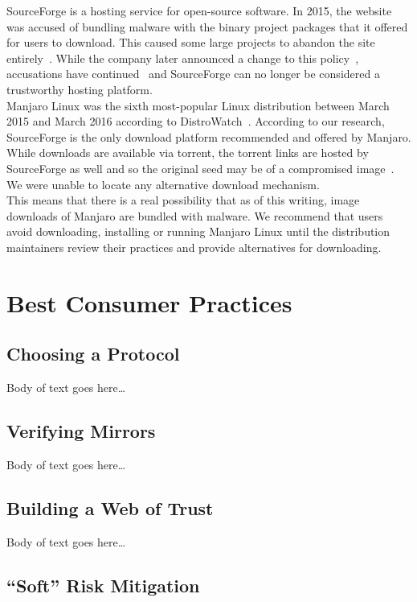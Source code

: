 \documentclass[conference]{IEEEtran}
\begin{document}
SourceForge is a hosting service for open-source software. In 2015, the
website was accused of bundling malware with the binary project packages
that it offered for users to download. This caused some large projects to
abandon the site entirely~\cite{GIMPSourceForge}. While the company later
announced a change to this policy~\cite{SourceForgePolicy}, accusations
have continued~\cite{NmapSourceForge} and SourceForge can no longer be considered
a trustworthy hosting platform.\\
\indent Manjaro Linux was the sixth most-popular Linux distribution between March 2015
and March 2016 according to DistroWatch~\cite{DistroWatch}. According to our research,
SourceForge is the only download platform recommended and offered by
Manjaro. While downloads are available via torrent, the torrent
links are hosted by SourceForge as well and so the original seed may be of a compromised
image~\cite{ManjaroDownload}. We were unable to locate any alternative download mechanism.\\
\indent This means that there is a real possibility that as of this writing, image downloads
of Manjaro are bundled with malware. We recommend that users avoid downloading, installing
or running Manjaro Linux until the distribution maintainers review their practices and
provide alternatives for downloading.

\section{Best Consumer Practices}

\subsection{Choosing a Protocol}

Body of text goes here\ldots

\subsection{Verifying Mirrors}

Body of text goes here\ldots

\subsection{Building a Web of Trust}

Body of text goes here\ldots

\subsection{``Soft'' Risk Mitigation}
\end{document}
